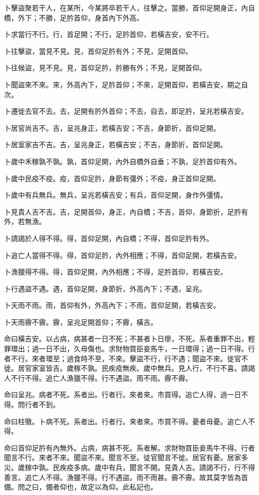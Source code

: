 \begin{pinyinscope}
卜擊盜聚若干人，在某所，今某將卒若干人，往擊之。當勝，首仰足開身正，內自橋，外下；不勝，足肣首仰，身首內下外高。

卜求當行不行。行，首足開；不行，足肣首仰，若橫吉安，安不行。

卜往擊盜，當見不見。見，首仰足肣有外；不見，足開首仰。

卜往候盜，見不見。見，首仰足肣，肣勝有外；不見，足開首仰。

卜聞盜來不來。來，外高內下，足肣首仰；不來，足開首仰，若橫吉安，期之自次。

卜遷徙去官不去。去，足開有肣外首仰；不去，自去，即足肣，呈兆若橫吉安。

卜居官尚吉不。吉，呈兆身正，若橫吉安；不吉，身節折，首仰足開。

卜居室家吉不吉。吉，呈兆身正，若橫吉安；不吉，身節折，首仰足開。

卜歲中禾稼孰不孰。孰，首仰足開，內外自橋外自垂；不孰，足肣首仰有外。

卜歲中民疫不疫。疫，首仰足肣，身節有彊外；不疫，身正首仰足開。

卜歲中有兵無兵。無兵，呈兆若橫吉安；有兵，首仰足開，身作外彊情。

卜見貴人吉不吉。吉，足開首仰，身正，內自橋；不吉，首仰，身節折，足肣有外，若無漁。

卜請謁於人得不得。得，首仰足開，內自橋；不得，首仰足肣有外。

卜追亡人當得不得。得，首仰足肣，內外相應；不得，首仰足開，若橫吉安。

卜漁獵得不得。得，首仰足開，內外相應；不得，足肣首仰，若橫吉安。

卜行遇盜不遇。遇，首仰足開，身節折，外高內下；不遇，呈兆。

卜天雨不雨。雨，首仰有外，外高內下；不雨，首仰足開，若橫吉安。

卜天雨霽不霽。霽，呈兆足開首仰；不霽，橫吉。

命曰橫吉安。以占病，病甚者一日不死；不甚者卜日瘳，不死。系者重罪不出，輕罪環出；過一日不出，久毋傷也。求財物買臣妾馬牛，一日環得；過一日不得。行者不行。來者環至；過食時不至，不來。擊盜不行，行不遇；聞盜不來。徙官不徙。居官家室皆吉。歲稼不孰。民疾疫無疾。歲中無兵。見人行，不行不喜。請謁人不行不得。追亡人漁獵不得。行不遇盜。雨不雨。霽不霽。

命曰呈兆。病者不死。系者出。行者行。來者來。市買得。追亡人得，過一日不得。問行者不到。

命曰柱徹。卜病不死。系者出。行者行。來者來。市買不得。憂者毋憂。追亡人不得。

命曰首仰足肣有內無外。占病，病甚不死。系者解。求財物買臣妾馬牛不得。行者聞言不行。來者不來。聞盜不來。聞言不至。徒官聞言不徙。居官有憂。居家多災。歲稼中孰。民疾疫多病。歲中有兵，聞言不開。見貴人吉。請謁不行，行不得善言。追亡人不得。漁獵不得。行不遇盜。雨不雨甚。霽不霽。故其莫字皆為首備。問之曰，備者仰也，故定以為仰。此私記也。


\end{pinyinscope}
